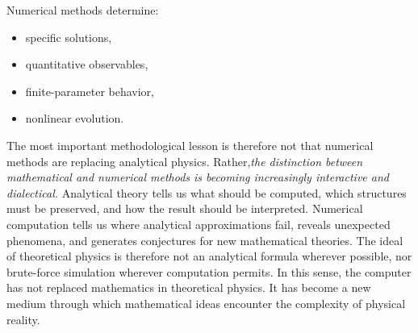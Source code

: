 Numerical methods determine:
\begin{itemize}
\item{specific solutions},
\item{quantitative observables},
\item{finite-parameter behavior},
\item{nonlinear evolution}.
\end{itemize}
The most important methodological lesson is therefore not that numerical
methods are replacing analytical physics.
Rather,\emph{the distinction between mathematical and numerical methods
is becoming increasingly interactive and dialectical.}
Analytical theory tells us what should be computed, which structures must be
preserved, and how the result should be interpreted. Numerical computation
tells us where analytical approximations fail, reveals unexpected phenomena,
and generates conjectures for new mathematical theories.
The ideal of theoretical physics is therefore not an analytical formula
wherever possible, nor brute-force simulation wherever computation permits.
In this sense, the computer has not replaced mathematics in theoretical
physics. It has become a new medium through which mathematical ideas encounter
the complexity of physical reality.
